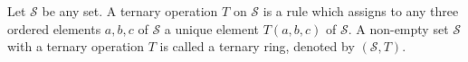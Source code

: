 Let $\mathcal{S}$ be any set. A ternary operation $T$ on $\mathcal{S}$ is a rule which assigns to any three ordered elements $a, b, c$ of $\mathcal{S}$ a unique element $T(a, b, c)$ of $\mathcal{S}$. A non-empty set $\mathcal{S}$ with a ternary operation $T$ is called a ternary ring, denoted by $(\mathcal{S}, T)$.
